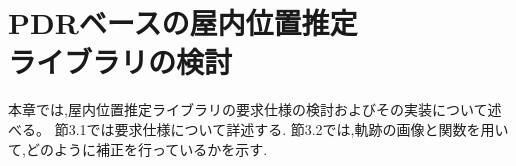 


\section{PDRベースの屋内位置推定\\ライブラリの検討}
本章では,屋内位置推定ライブラリの要求仕様の検討およびその実装について述べる。
節3.1では要求仕様について詳述する.
節3.2では,軌跡の画像と関数を用いて,どのように補正を行っているかを示す.












